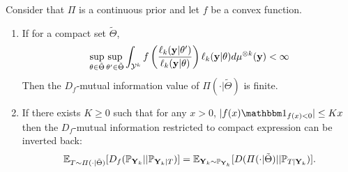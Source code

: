 \begin{prop}[Invertibility]\label{prop:PS:invertibility}
    Consider that $\varPi$ is a continuous prior and let $f$ be a convex function. %
    \begin{enumerate}
        \item If for a compact set $\tilde\Theta$,
        \begin{equation}
            \sup_{\theta\in\tilde\Theta}\sup_{\theta'\in\tilde\Theta} \int_{\mathcal{Y}^k} f\left(\frac{\ell_k(\mathbf{y}|\theta')}{\ell_k(\mathbf{y}|\theta)}  \right) \ell_k(\mathbf{y}|\theta) d\mu^{\otimes k}(\mathbf{y})<\infty
        \end{equation}
    Then the $D_f$-mutual information value of $\varPi(\cdot|\tilde\Theta)$ is finite. %
        \item
    If there exists $K\geq0$ such that for any $x>0$, $|f(x)\indic_{f(x)<0}|\leq Kx $ then the $D_f$-mutual information restricted to compact expression can be inverted back:
        \begin{equation}\label{eq:PS:fubDf}
            \mathbb{E}_{T\sim\varPi(\cdot|\tilde\Theta)}[D_f(\mathbb{P}_{\mathbf{Y}_k}||\mathbb{P}_{\mathbf{Y}_k|T})] 
                =\mathbb{E}_{\mathbf{Y}_k\sim\mathbb{P}_{\mathbf{Y}_k}} [D(\varPi(\cdot|\tilde\Theta)|| \mathbb{P}_{T|\mathbf{Y}_k} ) ]. 
        \end{equation}
    \end{enumerate}
\end{prop}

